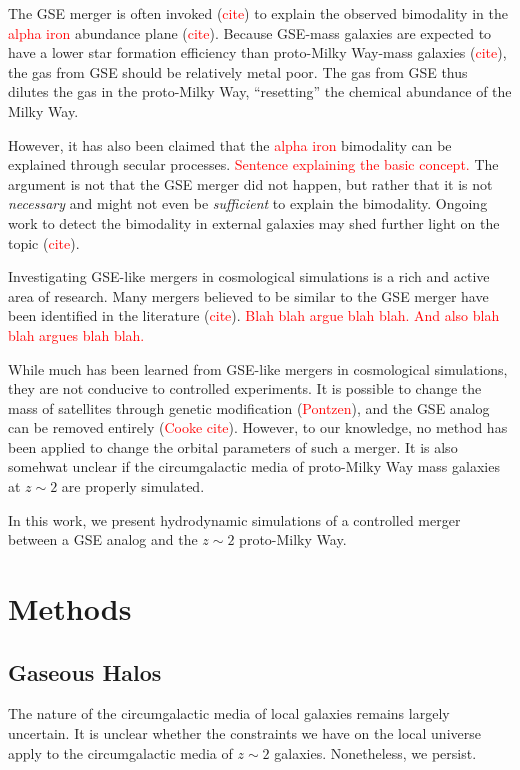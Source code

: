 \documentclass[linenumbers, twocolumn]{aastex631}
\begin{document}
The GSE merger is often invoked (\textcolor{red}{cite}) to explain the observed
bimodality in the \textcolor{red}{alpha iron} abundance plane
(\textcolor{red}{cite}). Because GSE-mass galaxies are expected to have a lower
star formation efficiency than proto-Milky Way-mass galaxies
(\textcolor{red}{cite}), the gas from GSE should be relatively metal poor. The
gas from GSE thus dilutes the gas in the proto-Milky Way, ``resetting'' the
chemical abundance of the Milky Way.

However, it has also been claimed that the \textcolor{red}{alpha iron}
bimodality can be explained through secular processes. \textcolor{red}{Sentence
explaining the basic concept.} The argument is not that the GSE merger did not
happen, but rather that it is not {\it necessary} and might not even be {\it
sufficient} to explain the bimodality. Ongoing work to detect the bimodality in
external galaxies may shed further light on the topic (\textcolor{red}{cite}).

Investigating GSE-like mergers in cosmological simulations is a rich and active
area of research. Many mergers believed to be similar to the GSE merger have
been identified in the literature (\textcolor{red}{cite}). \textcolor{red}{Blah
blah argue blah blah. And also blah blah argues blah blah.}

While much has been learned from GSE-like mergers in cosmological simulations,
they are not conducive to controlled experiments. It is possible to change the
mass of satellites through genetic modification (\textcolor{red}{Pontzen}), and
the GSE analog can be removed entirely (\textcolor{red}{Cooke cite}). However,
to our knowledge, no method has been applied to change the orbital parameters of
such a merger. It is also somehwat unclear if the circumgalactic media of
proto-Milky Way mass galaxies at $z\sim2$ are properly simulated.

In this work, we present hydrodynamic simulations of a controlled merger between
a GSE analog and the $z\sim2$ proto-Milky Way. 

\section{Methods}\label{sec:methods}

\subsection{Gaseous Halos}\label{ssec:gashalo} 

The nature of the circumgalactic media of local galaxies remains largely
uncertain. It is unclear whether the constraints we have on the local universe
apply to the circumgalactic media of $z\sim2$ galaxies. Nonetheless, we persist.
\end{document}
